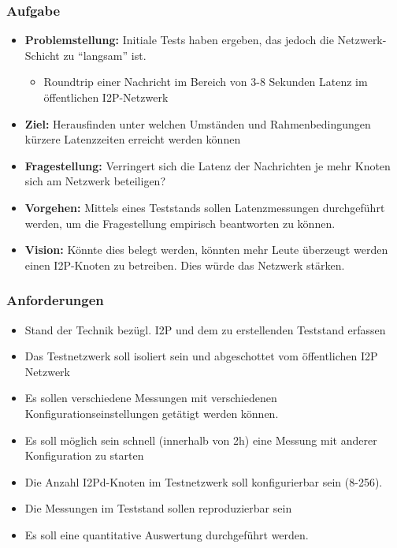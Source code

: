 \documentclass{beamer}
\begin{document}
    \begin{frame}[allowframebreaks]
        \frametitle{Aufgabe}

        \begin{itemize}
            \item \textbf{Problemstellung:} Initiale Tests haben ergeben, das jedoch die Netzwerk-Schicht zu ``langsam'' ist.
                \begin{itemize}
                    \item Roundtrip einer Nachricht im Bereich von 3-8 Sekunden Latenz im öffentlichen I2P-Netzwerk
                \end{itemize}
              \item\textbf{Ziel: }Herausfinden unter welchen Umständen und Rahmenbedingungen kürzere Latenzzeiten erreicht werden können
            \item \textbf{Fragestellung:} Verringert sich die Latenz der Nachrichten je mehr Knoten sich am Netzwerk beteiligen?
            \item \textbf{Vorgehen:} Mittels eines Teststands sollen Latenzmessungen durchgeführt werden, um die Fragestellung empirisch beantworten zu können.
            \item \textbf{Vision:} Könnte dies belegt werden, könnten mehr Leute überzeugt werden einen I2P-Knoten zu betreiben. Dies würde das Netzwerk stärken.
        \end{itemize}

    \end{frame} %

    \begin{frame}
        \frametitle{Anforderungen}

        \begin{itemize}
            \item Stand der Technik bezügl. I2P und dem zu erstellenden Teststand erfassen
            \item Das Testnetzwerk soll isoliert sein und abgeschottet vom öffentlichen I2P Netzwerk
            \item Es sollen verschiedene Messungen mit verschiedenen Konfigurationseinstellungen getätigt werden können.
            \item Es soll möglich sein schnell (innerhalb von 2h) eine Messung mit anderer Konfiguration zu starten
            \item Die Anzahl I2Pd-Knoten im Testnetzwerk soll konfigurierbar sein (8-256).
            \item Die Messungen im Teststand sollen reproduzierbar sein
            \item Es soll eine quantitative Auswertung durchgeführt werden.
          \end{itemize}
    \end{frame}
\end{document}
